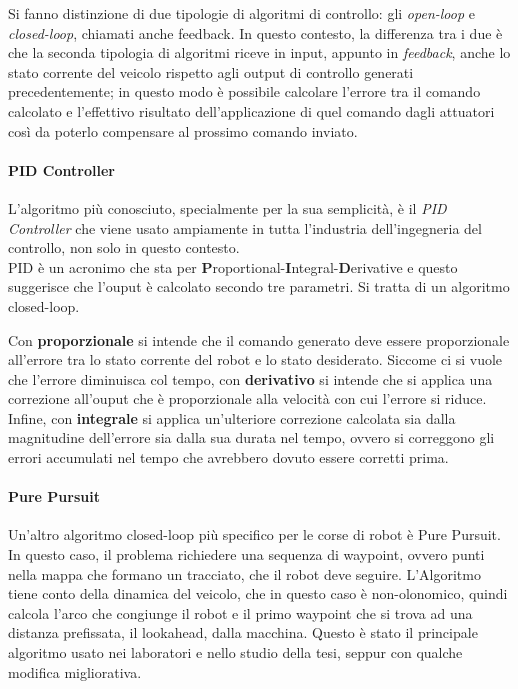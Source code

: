 Si fanno distinzione di due tipologie di algoritmi di controllo: gli \textit{open-loop} e
\textit{closed-loop}, chiamati anche feedback. In questo contesto, la differenza tra i due è che la
seconda tipologia di algoritmi riceve in input, appunto in \textit{feedback}, anche lo stato corrente del
veicolo rispetto agli output di controllo generati precedentemente; in questo modo è possibile calcolare
l'errore tra il comando calcolato e l'effettivo risultato dell'applicazione di quel comando dagli
attuatori così da poterlo compensare al prossimo comando inviato.

\paragraph{PID Controller}
L'algoritmo più conosciuto, specialmente per la sua semplicità, è il \textit{PID Controller} che viene
usato ampiamente in tutta l'industria dell'ingegneria del controllo, non solo in questo contesto.\\
PID è un acronimo che sta per \textbf{P}roportional-\textbf{I}ntegral-\textbf{D}erivative e questo
suggerisce che l'ouput è calcolato secondo tre parametri. Si tratta di un algoritmo closed-loop.

Con \textbf{proporzionale} si intende che il comando generato deve essere proporzionale all'errore tra lo
stato corrente del robot e lo stato desiderato.
Siccome ci si vuole che l'errore diminuisca col tempo, con \textbf{derivativo} si intende che si applica
una correzione all'ouput che è proporzionale alla velocità con cui l’errore si riduce.
Infine, con \textbf{integrale} si applica un'ulteriore correzione calcolata sia dalla magnitudine
dell'errore sia dalla sua durata nel tempo, ovvero si correggono gli errori accumulati nel tempo che
avrebbero dovuto essere corretti prima.

\paragraph{Pure Pursuit}
Un'altro algoritmo closed-loop più specifico per le corse di robot è Pure Pursuit. In questo caso, il
problema richiedere una sequenza di waypoint, ovvero punti nella mappa che formano un tracciato, che il
robot deve seguire. L'Algoritmo tiene conto della dinamica del veicolo, che in questo caso è
non-olonomico, quindi calcola l'arco che congiunge il robot e il primo waypoint che si trova ad una
distanza prefissata, il lookahead, dalla macchina.
Questo è stato il principale algoritmo usato nei laboratori e nello studio della tesi, seppur con qualche
modifica migliorativa.


